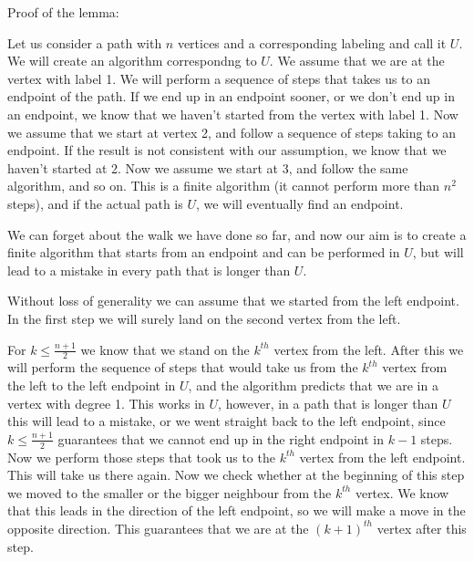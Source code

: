 \documentclass{article}
\begin{document}
	Proof of the lemma:
	
	Let us consider a path with \(\displaystyle n\) vertices and a corresponding labeling and call it \(\displaystyle U\). We will create an algorithm correspondng to \(\displaystyle U\). We assume that we are at the vertex with label 1. We will perform a sequence of steps that takes us to an endpoint of the path. If we end up in an endpoint sooner, or we don't end up in an endpoint, we know that we haven't started from the vertex with label 1. Now we assume that we start at vertex 2, and follow a sequence of steps taking to an endpoint. If the result is not consistent with our assumption, we know that we haven't started at 2. Now we assume we start at 3, and follow the same algorithm, and so on. This is a finite algorithm (it cannot perform more than \(\displaystyle n^2\) steps), and if the actual path is \(\displaystyle U\), we will eventually find an endpoint.
	
	We can forget about the walk we have done so far, and now our aim is to create a finite algorithm that starts from an endpoint and can be performed in \(\displaystyle U\), but will lead to a mistake in every path that is longer than \(\displaystyle U\).
	
	Without loss of generality we can assume that we started from the left endpoint. In the first step we will surely land on the second vertex from the left.
	
	For \(\displaystyle k\le \frac{n+1}{2}\) we know that we stand on the \(\displaystyle k^{th}\) vertex from the left. After this we will perform the sequence of steps that would take us from the \(\displaystyle k^{th}\) vertex from the left to the left endpoint in \(\displaystyle U\), and the algorithm predicts that we are in a vertex with degree 1. This works in \(\displaystyle U\), however, in a path that is longer than \(\displaystyle U\) this will lead to a mistake, or we went straight back to the left endpoint, since \(\displaystyle k\le \frac{n+1}{2}\) guarantees that we cannot end up in the right endpoint in \(\displaystyle k-1\) steps. Now we perform those steps that took us to the \(\displaystyle k^{th}\) vertex from the left endpoint. This will take us there again. Now we check whether at the beginning of this step we moved to the smaller or the bigger neighbour from the \(\displaystyle k^{th}\) vertex. We know that this leads in the direction of the left endpoint, so we will make a move in the opposite direction. This guarantees that we are at the \(\displaystyle (k+1)^{th}\) vertex after this step.
	
\end{document}
